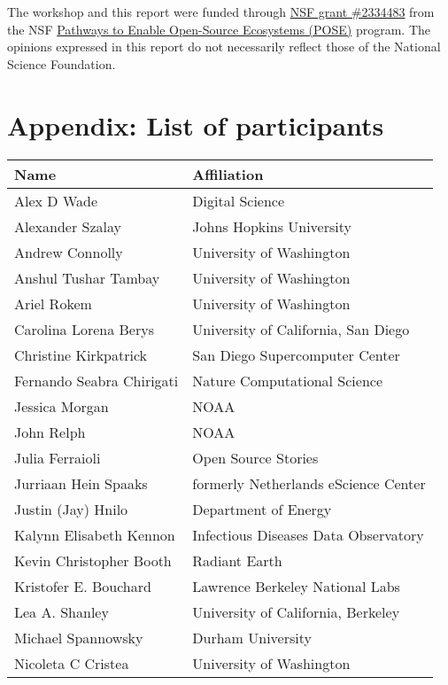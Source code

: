 \documentclass[
  letterpaper,
  DIV=11,
  numbers=noendperiod]{scrartcl}
\begin{document}
The workshop and this report were funded through
\href{https://www.nsf.gov/awardsearch/showAward?AWD_ID=2334483&HistoricalAwards=false}{NSF
grant \#2334483} from the NSF
\href{https://new.nsf.gov/funding/opportunities/pathways-enable-open-source-ecosystems-pose}{Pathways
to Enable Open-Source Ecosystems (POSE)} program. The opinions expressed
in this report do not necessarily reflect those of the National Science
Foundation.

\section{Appendix: List of
participants}\label{appendix-list-of-participants}

\begin{longtable}[]{@{}ll@{}}
\toprule\noalign{}
Name & Affiliation \\
\midrule\noalign{}
\endhead
\bottomrule\noalign{}
\endlastfoot
Alex D Wade & Digital Science \\
Alexander Szalay & Johns Hopkins University \\
Andrew Connolly & University of Washington \\
Anshul Tushar Tambay & University of Washington \\
Ariel Rokem & University of Washington \\
Carolina Lorena Berys & University of California, San Diego \\
Christine Kirkpatrick & San Diego Supercomputer Center \\
Fernando Seabra Chirigati & Nature Computational Science \\
Jessica Morgan & NOAA \\
John Relph & NOAA \\
Julia Ferraioli & Open Source Stories \\
Jurriaan Hein Spaaks & formerly Netherlands eScience Center \\
Justin (Jay) Hnilo & Department of Energy \\
Kalynn Elisabeth Kennon & Infectious Diseases Data Observatory \\
Kevin Christopher Booth & Radiant Earth \\
Kristofer E. Bouchard & Lawrence Berkeley National Labs \\
Lea A. Shanley & University of California, Berkeley \\
Michael Spannowsky & Durham University \\
Nicoleta C Cristea & University of Washington \\

\end{longtable}
\end{document}

